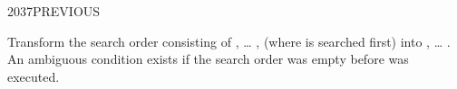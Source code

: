 \begin{worddef}{2037}{PREVIOUS}
\item \stack{}{}

	Transform the search order consisting of , {\ldots}
	,  (where  is searched
	first) into , {\ldots} . An ambiguous
	condition exists if the search order was empty before
	 was executed.

	\begin{implement}
	\end{implement}
\end{worddef}
